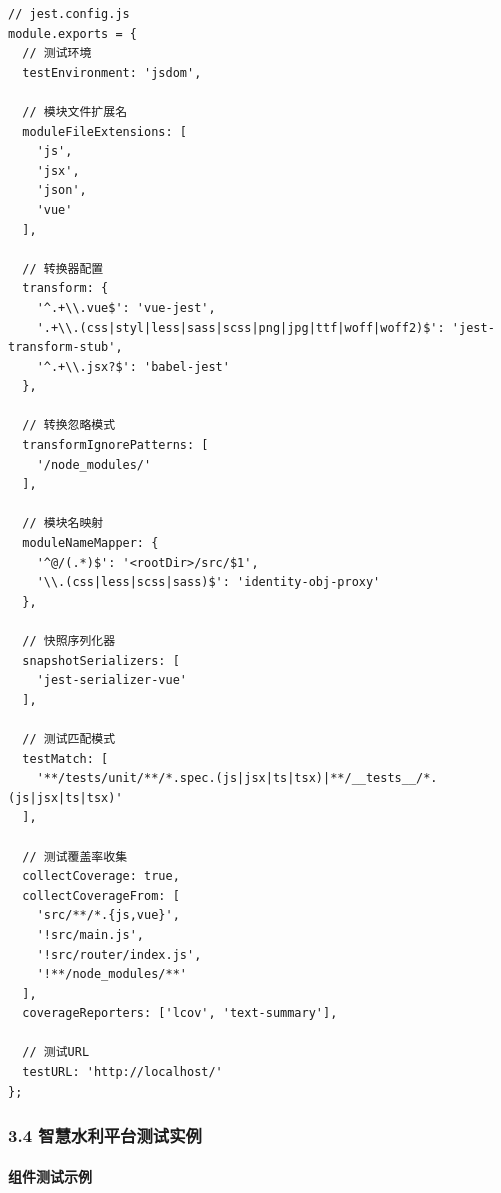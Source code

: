 \begin{lstlisting}
// jest.config.js
module.exports = {
  // 测试环境
  testEnvironment: 'jsdom',
  
  // 模块文件扩展名
  moduleFileExtensions: [
    'js',
    'jsx',
    'json',
    'vue'
  ],
  
  // 转换器配置
  transform: {
    '^.+\\.vue$': 'vue-jest',
    '.+\\.(css|styl|less|sass|scss|png|jpg|ttf|woff|woff2)$': 'jest-transform-stub',
    '^.+\\.jsx?$': 'babel-jest'
  },
  
  // 转换忽略模式
  transformIgnorePatterns: [
    '/node_modules/'
  ],
  
  // 模块名映射
  moduleNameMapper: {
    '^@/(.*)$': '<rootDir>/src/$1',
    '\\.(css|less|scss|sass)$': 'identity-obj-proxy'
  },
  
  // 快照序列化器
  snapshotSerializers: [
    'jest-serializer-vue'
  ],
  
  // 测试匹配模式
  testMatch: [
    '**/tests/unit/**/*.spec.(js|jsx|ts|tsx)|**/__tests__/*.(js|jsx|ts|tsx)'
  ],
  
  // 测试覆盖率收集
  collectCoverage: true,
  collectCoverageFrom: [
    'src/**/*.{js,vue}',
    '!src/main.js',
    '!src/router/index.js',
    '!**/node_modules/**'
  ],
  coverageReporters: ['lcov', 'text-summary'],
  
  // 测试URL
  testURL: 'http://localhost/'
};
\end{lstlisting}

\subsubsection{3.4
智慧水利平台测试实例}\label{ux667aux6167ux6c34ux5229ux5e73ux53f0ux6d4bux8bd5ux5b9eux4f8b}

\paragraph{组件测试示例}\label{ux7ec4ux4ef6ux6d4bux8bd5ux793aux4f8b}

